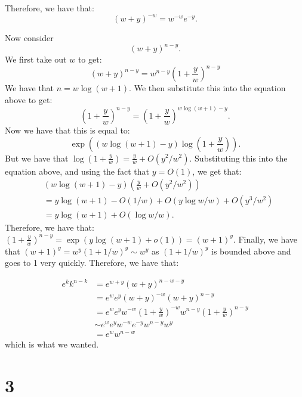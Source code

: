 \documentclass[]{article}
\begin{document}
Therefore, we have that:
\begin{equation}
	(w + y)^{-w} = w^{-w} e^{-y}.
\end{equation}

Now consider
\begin{equation}
	(w + y)^{n - y}.
\end{equation}
We first take out $w$ to get:
\begin{equation}
	(w + y)^{n - y} = w^{n - y} \left(1 + \frac{y}{w}\right)^{n - y}
\end{equation}
We have that $n = w \log (w + 1)$. We then substitute this into the equation above to get:
\begin{equation}
	\left(1 + \frac{y}{w}\right)^{n - y} = \left(1 + \frac{y}{w}\right)^{w \log(w + 1) - y}.
\end{equation}
Now we have that this is equal to:
\begin{equation}
	\exp((w \log(w + 1) - y) \log\left(1 + \frac{y}{w}\right)).
\end{equation}
But we have that $\log\left(1 + \frac{y}{w}\right) = \frac{y}{w} + O(y^2/w^2)$. Substituting this into the equation above, and using the fact that $y = O(1)$, we get that:
\begin{align*}
	&(w \log(w + 1) - y)(\frac{y}{w} + O(y^2/w^2))\\ 
	&= y \log(w + 1) - O(1/w) + O(y \log w/w) + O(y^3/w^2)\\ 
	&=  y \log(w + 1) + O(\log w / w).
\end{align*}
Therefore, we have that:
$\left(1 + \frac{y}{w}\right)^{n - y} = \exp(y \log(w + 1) + o(1)) = (w + 1)^y$. 
Finally, we have that $(w + 1)^y = w^y (1 + 1/w)^y \sim w^y$ as $(1 + 1/w)^y$ is bounded above and goes to 1 very quickly. 
Therefore, we have that:

\begin{align*}
	e^k k^{n - k} &= e^{w + y}(w + y)^{n - w - y}\\
	&=e^w e^y (w + y)^{-w} (w + y)^{n - y}\\
	&= e^w e^y w^{-w} \left(1 + \frac{y}{w}\right)^{- w}  w^{n - y}   \left(1 + \frac{y}{w}\right)^{n - y}\\
	&\sim e^w e^y w^{-w} e^{-y}  w^{n - y} w^y\\
	&= e^w w^{n - w}
\end{align*}
which is what we wanted. 
\section{3}
\end{document}
